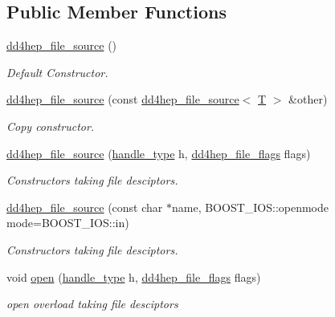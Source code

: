 \subsection*{Public Member Functions}
\begin{DoxyCompactItemize}
\item 
\hyperlink{class_d_d4hep_1_1dd4hep__file__source_a030d8a2563b52d4ea5f206e2d1dbaef5}{dd4hep\_\-file\_\-source} ()
\begin{DoxyCompactList}\small\item\em Default Constructor. \item\end{DoxyCompactList}\item 
\hyperlink{class_d_d4hep_1_1dd4hep__file__source_a0f0b058ced88e3e25a3f5ec615ce234b}{dd4hep\_\-file\_\-source} (const \hyperlink{class_d_d4hep_1_1dd4hep__file__source}{dd4hep\_\-file\_\-source}$<$ \hyperlink{class_t}{T} $>$ \&other)
\begin{DoxyCompactList}\small\item\em Copy constructor. \item\end{DoxyCompactList}\item 
\hyperlink{class_d_d4hep_1_1dd4hep__file__source_a66badf1d47206c7d61e0e036e910999e}{dd4hep\_\-file\_\-source} (\hyperlink{class_t}{handle\_\-type} h, \hyperlink{namespace_d_d4hep_a31d19f9b0ce567067d2897fbda1761e5}{dd4hep\_\-file\_\-flags} flags)
\begin{DoxyCompactList}\small\item\em Constructors taking file desciptors. \item\end{DoxyCompactList}\item 
\hyperlink{class_d_d4hep_1_1dd4hep__file__source_a84e465929a469a23c8347adf98f68afe}{dd4hep\_\-file\_\-source} (const char $\ast$name, BOOST\_\-IOS::openmode mode=BOOST\_\-IOS::in)
\begin{DoxyCompactList}\small\item\em Constructors taking file desciptors. \item\end{DoxyCompactList}\item 
void \hyperlink{class_d_d4hep_1_1dd4hep__file__source_a367c212f20de3cfe79b5e69403a5a256}{open} (\hyperlink{class_t}{handle\_\-type} h, \hyperlink{namespace_d_d4hep_a31d19f9b0ce567067d2897fbda1761e5}{dd4hep\_\-file\_\-flags} flags)
\begin{DoxyCompactList}\small\item\em open overload taking file desciptors \item\end{DoxyCompactList}\item 

\end{DoxyCompactItemize}
